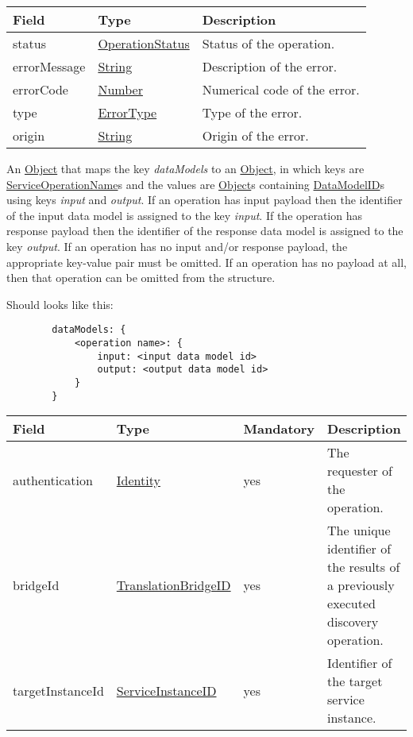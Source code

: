\documentclass[a4paper]{arrowhead}
\newcommand{\pref}[1]{{\textcolor{ArrowheadGrey}{\hyperref[sec:model:primitives:#1]{#1}}}}
\begin{document}

\begin{table}[ht!]
\begin{tabularx}{\textwidth}{| p{4.25cm} | p{3.5cm} | X |} \hline
\rowcolor{gray!33} Field & Type      & Description \\ \hline
status & \pref{OperationStatus} & Status of the operation. \\ \hline
errorMessage & \pref{String} & Description of the error. \\ \hline
errorCode &\pref{Number}  & Numerical code of the error. \\ \hline
type & \pref{ErrorType} & Type of the error. \\ \hline
origin & \pref{String} & Origin of the error. \\ \hline
\end{tabularx}
\end{table}


An \pref{Object} that maps the key \textit{dataModels} to an \pref{Object}, in which keys are \pref{ServiceOperationName}s and the values are \pref{Object}s containing \pref{DataModelID}s using keys \textit{input} and \textit{output}. If an operation has input payload then the identifier of the input data model is assigned to the key \textit{input}. If the operation has response payload then the identifier of the response data model is assigned to the key \textit{output}. If an operation has no input and/or response payload, the appropriate key-value pair must be omitted. If an operation has no payload at all, then that operation can be omitted from the structure.

\clearpage

Should looks like this:
\begin{verbatim}
        dataModels: { 
            <operation name>: { 
                input: <input data model id> 
                output: <output data model id>
            } 
        }
\end{verbatim}

 
\begin{table}[ht!]
\begin{tabularx}{\textwidth}{| p{3.9cm} | p{5.5cm} | p{1.3cm} | X |} \hline
\rowcolor{gray!33} Field & Type & Mandatory & Description \\ \hline
authentication & \hyperref[sec:model:Identity]{Identity} & yes & The requester of the operation. \\ \hline
bridgeId & \pref{TranslationBridgeID} & yes & The unique identifier of the results of a previously executed discovery operation. \\ \hline
targetInstanceId & \pref{ServiceInstanceID} & yes & Identifier of the target service instance. \\ \hline
\end{tabularx}
\end{table}
\end{document}

